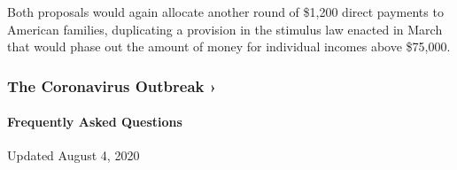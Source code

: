 Both proposals would again allocate another round of \$1,200 direct
payments to American families, duplicating a provision in the stimulus
law enacted in March that would phase out the amount of money for
individual incomes above \$75,000.

\href{https://www.nytimes.com/news-event/coronavirus?action=click\&pgtype=Article\&state=default\&region=MAIN_CONTENT_3\&context=storylines_faq}{}

\hypertarget{the-coronavirus-outbreak-}{%
\subsubsection{The Coronavirus Outbreak
›}\label{the-coronavirus-outbreak-}}

\hypertarget{frequently-asked-questions}{%
\paragraph{Frequently Asked
Questions}\label{frequently-asked-questions}}

Updated August 4, 2020

